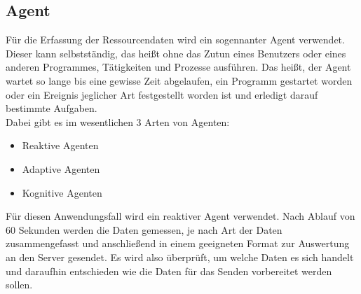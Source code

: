 \documentclass{report}
\begin{document}
\subsection{Agent}
Für die Erfassung der Ressourcendaten wird ein sogennanter Agent verwendet. Dieser kann selbstständig, das heißt ohne das Zutun eines Benutzers oder eines anderen Programmes, Tätigkeiten und Prozesse ausführen. Das heißt, der Agent wartet so lange bis eine gewisse Zeit abgelaufen, ein Programm gestartet worden oder ein Ereignis jeglicher Art festgestellt worden ist und erledigt darauf bestimmte Aufgaben.\\
Dabei gibt es im wesentlichen 3 Arten von Agenten:
\begin{itemize}
    \item Reaktive Agenten
    \item Adaptive Agenten
    \item Kognitive Agenten
\end{itemize}
Für diesen Anwendungsfall wird ein reaktiver Agent verwendet. Nach Ablauf von 60 Sekunden werden die Daten gemessen, je nach Art der Daten zusammengefasst und anschließend in einem geeigneten Format zur Auswertung an den Server gesendet. Es wird also überprüft, um welche Daten es sich handelt und daraufhin entschieden wie die Daten für das Senden vorbereitet werden sollen.
\end{document}
